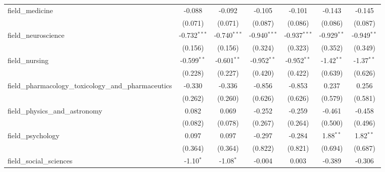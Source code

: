 \begin{tabular}{lcccccc}
   field\_medicine                                             & -0.088         & -0.092         & -0.105         & -0.101         & -0.143         & -0.145\\   
                                                               & (0.071)        & (0.071)        & (0.087)        & (0.086)        & (0.086)        & (0.087)\\   
   field\_neuroscience                                         & -0.732$^{***}$ & -0.740$^{***}$ & -0.940$^{***}$ & -0.937$^{***}$ & -0.929$^{**}$  & -0.949$^{**}$\\   
                                                               & (0.156)        & (0.156)        & (0.324)        & (0.323)        & (0.352)        & (0.349)\\   
   field\_nursing                                              & -0.599$^{**}$  & -0.601$^{**}$  & -0.952$^{**}$  & -0.952$^{**}$  & -1.42$^{**}$   & -1.37$^{**}$\\   
                                                               & (0.228)        & (0.227)        & (0.420)        & (0.422)        & (0.639)        & (0.626)\\   
   field\_pharmacology\_toxicology\_and\_pharmaceutics         & -0.330         & -0.336         & -0.856         & -0.853         & 0.237          & 0.256\\   
                                                               & (0.262)        & (0.260)        & (0.626)        & (0.626)        & (0.579)        & (0.581)\\   
   field\_physics\_and\_astronomy                              & 0.082          & 0.069          & -0.252         & -0.259         & -0.461         & -0.458\\   
                                                               & (0.082)        & (0.078)        & (0.267)        & (0.264)        & (0.500)        & (0.496)\\   
   field\_psychology                                           & 0.097          & 0.097          & -0.297         & -0.284         & 1.88$^{**}$    & 1.82$^{**}$\\   
                                                               & (0.364)        & (0.364)        & (0.822)        & (0.821)        & (0.694)        & (0.687)\\   
   field\_social\_sciences                                     & -1.10$^{*}$    & -1.08$^{*}$    & -0.004         & 0.003          & -0.389         & -0.306\\   

\end{tabular}
